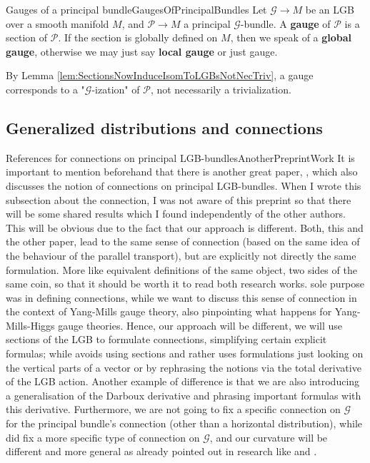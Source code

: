 \documentclass[a4paper,oneside,11pt,bibliography=totoc]{scrartcl}
\theoremstyle{plain}
\theoremstyle{remark}
\theoremstyle{definition}
\begin{document}
\begin{definitions}{Gauges of a principal bundle}{GaugesOfPrincipalBundles}
Let $\mathcal{G} \to M$ be an LGB over a smooth manifold $M$, and $\mathcal{P} \to M$ a principal $\mathcal{G}$-bundle. A \textbf{gauge} of $\mathcal{P}$ is a section of $\mathcal{P}$. If the section is globally defined on $M$, then we speak of a \textbf{global gauge}, otherwise we may just say \textbf{local gauge} or just gauge.
\end{definitions}

By Lemma \ref{lem:SectionsNowInduceIsomToLGBsNotNecTriv}, a gauge corresponds to a "$\mathcal{G}$-ization" of $\mathcal{P}$, not necessarily a trivialization.

\subsection{Generalized distributions and connections}

\begin{remarks}{References for connections on principal LGB-bundles}{AnotherPreprintWork}
It is important to mention beforehand that there is another great paper, \cite{OtherPreprintAboutConnection}, which also discusses the notion of connections on principal LGB-bundles. When I wrote this subsection about the connection, I was not aware of this preprint so that there will be some shared results which I found independently of the other authors. This will be obvious due to the fact that our approach is different. Both, this and the other paper, lead to the same sense of connection (based on the same idea of the behaviour of the parallel transport), but are explicitly not directly the same formulation. More like equivalent definitions of the same object, two sides of the same coin, so that it should be worth it to read both research works. \cite{OtherPreprintAboutConnection} sole purpose was in defining connections, while we want to discuss this sense of connection in the context of Yang-Mills gauge theory, also pinpointing what happens for Yang-Mills-Higgs gauge theories. Hence, our approach will be different, we will use sections of the LGB to formulate connections, simplifying certain explicit formulas; while \cite{OtherPreprintAboutConnection} avoids using sections and rather uses formulations just looking on the vertical parts of a vector or by rephrasing the notions via the total derivative of the LGB action. Another example of difference is that we are also introducing a generalisation of the Darboux derivative and phrasing important formulas with this derivative. Furthermore, we are not going to fix a specific connection on $\mathcal{G}$ for the principal bundle's connection (other than a horizontal distribution), while \cite{OtherPreprintAboutConnection} did fix a more specific type of connection on $\mathcal{G}$, and our curvature will be different and more general as already pointed out in research like \cite{CurvedYMH} and \cite{MyThesis}.
\end{remarks}
\end{document}
